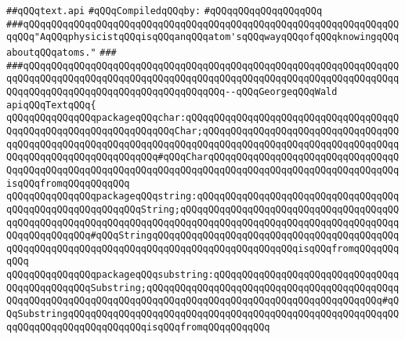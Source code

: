\label{src/lib/std/src/text.api}
\verb|##qQQqtext.api|\newline
\newline
\verb|#qQQqCompiledqQQqby:|\newline
\verb|#qQQqqQQqqQQqqQQqqQQq|\newline
\newline
\newline
\newline
\verb|###qQQqqQQqqQQqqQQqqQQqqQQqqQQqqQQqqQQqqQQqqQQqqQQqqQQqqQQqqQQqqQQqqQQqqQQq"AqQQqphysicistqQQqisqQQqanqQQqatom'sqQQqwayqQQqofqQQqknowingqQQqaboutqQQqatoms."|\newline
\verb|###|\newline
\verb|###qQQqqQQqqQQqqQQqqQQqqQQqqQQqqQQqqQQqqQQqqQQqqQQqqQQqqQQqqQQqqQQqqQQqqQQqqQQqqQQqqQQqqQQqqQQqqQQqqQQqqQQqqQQqqQQqqQQqqQQqqQQqqQQqqQQqqQQqqQQqqQQqqQQqqQQqqQQqqQQqqQQqqQQqqQQqqQQq--qQQqGeorgeqQQqWald|\newline
\newline
\newline
\newline
\verb|apiqQQqTextqQQq{|\newline
\newline
\verb|qQQqqQQqqQQqqQQqpackageqQQqchar:qQQqqQQqqQQqqQQqqQQqqQQqqQQqqQQqqQQqqQQqqQQqqQQqqQQqqQQqqQQqqQQqqQQqChar;qQQqqQQqqQQqqQQqqQQqqQQqqQQqqQQqqQQqqQQqqQQqqQQqqQQqqQQqqQQqqQQqqQQqqQQqqQQqqQQqqQQqqQQqqQQqqQQqqQQqqQQqqQQqqQQqqQQqqQQqqQQqqQQqqQQq#qQQqCharqQQqqQQqqQQqqQQqqQQqqQQqqQQqqQQqqQQqqQQqqQQqqQQqqQQqqQQqqQQqqQQqqQQqqQQqqQQqqQQqqQQqqQQqqQQqqQQqqQQqqQQqisqQQqfromqQQqqQQqqQQq|\newline
\verb|qQQqqQQqqQQqqQQqpackageqQQqstring:qQQqqQQqqQQqqQQqqQQqqQQqqQQqqQQqqQQqqQQqqQQqqQQqqQQqqQQqqQQqString;qQQqqQQqqQQqqQQqqQQqqQQqqQQqqQQqqQQqqQQqqQQqqQQqqQQqqQQqqQQqqQQqqQQqqQQqqQQqqQQqqQQqqQQqqQQqqQQqqQQqqQQqqQQqqQQqqQQqqQQqqQQq#qQQqStringqQQqqQQqqQQqqQQqqQQqqQQqqQQqqQQqqQQqqQQqqQQqqQQqqQQqqQQqqQQqqQQqqQQqqQQqqQQqqQQqqQQqqQQqqQQqqQQqisqQQqfromqQQqqQQqqQQq|\newline
\verb|qQQqqQQqqQQqqQQqpackageqQQqsubstring:qQQqqQQqqQQqqQQqqQQqqQQqqQQqqQQqqQQqqQQqqQQqqQQqSubstring;qQQqqQQqqQQqqQQqqQQqqQQqqQQqqQQqqQQqqQQqqQQqqQQqqQQqqQQqqQQqqQQqqQQqqQQqqQQqqQQqqQQqqQQqqQQqqQQqqQQqqQQqqQQqqQQq#qQQqSubstringqQQqqQQqqQQqqQQqqQQqqQQqqQQqqQQqqQQqqQQqqQQqqQQqqQQqqQQqqQQqqQQqqQQqqQQqqQQqqQQqqQQqisqQQqfromqQQqqQQqqQQq|\newline
